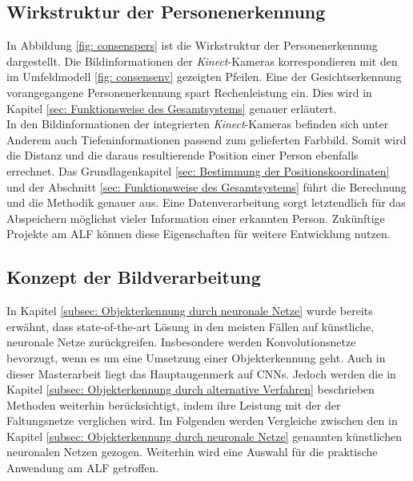 		\subsection{Wirkstruktur der Personenerkennung}
		\label{subsec: Wirkstrukur Personenerkennung}
		
		In Abbildung \ref{fig: consenspers} ist die Wirkstruktur der Personenerkennung dargestellt. Die Bildinformationen der \textit{Kinect}-Kameras korrespondieren mit den im Umfeldmodell \ref{fig: consensenv} gezeigten Pfeilen. Eine der Gesichtserkennung vorangegangene Personenerkennung spart Rechenleistung ein. Dies wird in Kapitel \ref{sec: Funktionsweise des Gesamtsystems} genauer erläutert.\\
		
		
	
		
		In den Bildinformationen der integrierten \textit{Kinect}-Kameras befinden sich unter Anderem auch Tiefeninformationen passend zum gelieferten Farbbild. Somit wird die Distanz und die daraus resultierende Position einer Person ebenfalls errechnet. Das Grundlagenkapitel \ref{sec: Bestimmung der Positionskoordinaten} und der Abschnitt \ref{sec: Funktionsweise des Gesamtsystems} führt die Berechnung und die Methodik genauer aus. Eine Datenverarbeitung sorgt letztendlich für das Abspeichern möglichst vieler Information einer erkannten Person. Zukünftige Projekte am ALF können diese Eigenschaften für weitere Entwicklung nutzen.\\   
		
		\subsection{Konzept der Bildverarbeitung}
		\label{subsec: Auswahl und Training der verwendeten neuronalen Netze}
		
		In Kapitel \ref{subsec: Objekterkennung durch neuronale Netze} wurde bereits erwähnt, dass state-of-the-art Lösung in den meisten Fällen auf künstliche, neuronale Netze zurückgreifen. Insbesondere werden Konvolutionsnetze bevorzugt, wenn es um eine Umsetzung einer Objekterkennung geht. Auch in dieser Masterarbeit liegt das Hauptaugenmerk auf CNNs. Jedoch werden die in Kapitel \ref{subsec: Objekterkennung durch alternative Verfahren} beschrieben Methoden weiterhin berücksichtigt, indem ihre Leistung mit der der Faltungsnetze verglichen wird. Im Folgenden werden Vergleiche zwischen den in Kapitel \ref{subsec: Objekterkennung durch neuronale Netze} genannten künstlichen neuronalen Netzen gezogen. Weiterhin wird eine Auswahl für die praktische Anwendung am ALF getroffen. \\
		
